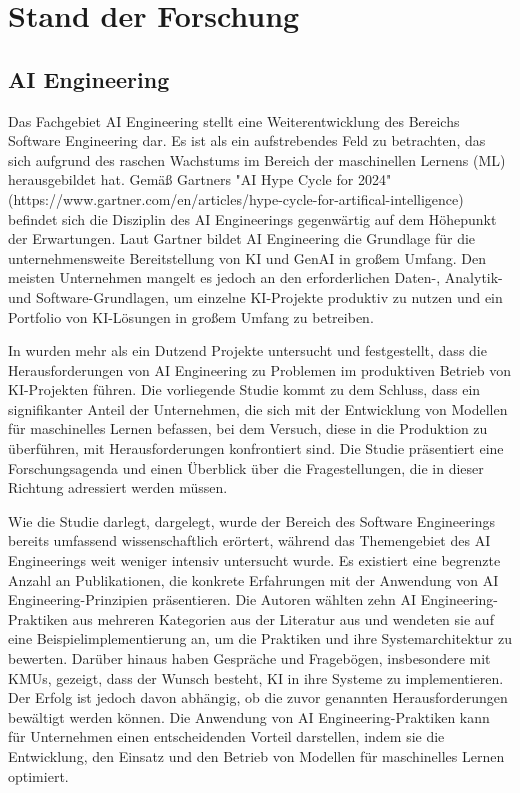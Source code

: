 \documentclass[11pt,a4paper,pointlessnumbers]{scrartcl}
\theoremstyle{break}
\numberwithin{equation}{section}
\begin{document}
\section{Stand der Forschung}
\subsection{AI Engineering}
Das Fachgebiet AI Engineering stellt eine Weiterentwicklung des Bereichs  Software Engineering dar. Es ist als ein aufstrebendes Feld zu betrachten, das sich aufgrund des raschen Wachstums im Bereich der maschinellen Lernens (ML) herausgebildet hat. Gemäß Gartners "AI Hype Cycle for 2024" (https://www.gartner.com/en/articles/hype-cycle-for-artifical-intelligence) befindet sich die Disziplin des AI Engineerings gegenwärtig auf dem Höhepunkt der Erwartungen. Laut Gartner bildet AI Engineering die Grundlage für die unternehmensweite Bereitstellung von KI und GenAI in großem Umfang. Den meisten Unternehmen mangelt es jedoch an den erforderlichen Daten-, Analytik- und Software-Grundlagen, um einzelne KI-Projekte produktiv zu nutzen und ein Portfolio von KI-Lösungen in großem Umfang zu betreiben. 

In \cite{boschEngineeringAISystems2021} wurden mehr als ein Dutzend Projekte untersucht und festgestellt, dass die Herausforderungen von AI Engineering zu Problemen im produktiven Betrieb von KI-Projekten führen. Die vorliegende Studie kommt zu dem Schluss, dass ein signifikanter Anteil der Unternehmen, die sich mit der Entwicklung von Modellen für maschinelles Lernen befassen, bei dem Versuch, diese in die Produktion zu überführen, mit Herausforderungen konfrontiert sind. Die Studie präsentiert eine Forschungsagenda und einen Überblick über die Fragestellungen, die in dieser Richtung adressiert werden müssen. 

Wie die Studie \cite{groteCaseStudyAI2023} darlegt, dargelegt, wurde der Bereich des Software Engineerings bereits umfassend wissenschaftlich erörtert, während das Themengebiet des AI Engineerings weit weniger intensiv untersucht wurde. Es existiert eine begrenzte Anzahl an Publikationen, die konkrete Erfahrungen mit der Anwendung von AI Engineering-Prinzipien präsentieren. Die Autoren wählten zehn AI Engineering-Praktiken aus mehreren Kategorien aus der Literatur aus und wendeten sie auf eine Beispielimplementierung an, um die Praktiken und ihre Systemarchitektur zu bewerten. Darüber hinaus haben Gespräche und Fragebögen, insbesondere mit KMUs, gezeigt, dass der Wunsch besteht, KI in ihre Systeme zu implementieren. Der Erfolg ist jedoch davon abhängig, ob die zuvor genannten Herausforderungen bewältigt werden können. Die Anwendung von AI Engineering-Praktiken kann für Unternehmen einen entscheidenden Vorteil darstellen, indem sie die Entwicklung, den Einsatz und den Betrieb von Modellen für maschinelles Lernen optimiert.
\end{document}
